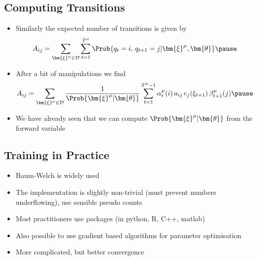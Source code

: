 
\begin{slide}
\section{Computing Transitions}
\begin{PauseHighLight}
  \begin{itemize}
  \item Similarly the expected number of transitions is given by
    \begin{align*}
      A_{ij} = \sum_{\bm{\xi}^\mu\in\mathcal{D}} \sum_{t=1}^{T^\mu}
      \Prob{q_t=i,\, q_{t+1}=j| \bm{\xi}^\mu, \bm{\theta}}\pause
    \end{align*}
  \item After a bit of manipulations we find
    \begin{align*}
      A_{ij} =  \sum_{\bm{\xi}^\mu\in\mathcal{D}} 
      \frac{1}{\Prob{\bm{\xi}^\mu|\bm{\theta}}}\sum_{t=1}^{T^\mu-1}
      \alpha^\mu_t(i)\, a_{ij}\, e_j(\xi_{t+1}) \, \beta^\mu_{t+1}(j)\pause
    \end{align*}
  \item We have already seen that we can compute
    $\Prob{\bm{\xi}^\mu|\bm{\theta}}$ from the forward variable\pause
  \end{itemize}
\end{PauseHighLight}

\end{slide}


\begin{slide}
\section{Training in Practice}

\begin{PauseHighLight}
  \begin{itemize}
  \item Baum-Welch is widely used\pause
  \item The implementation is slightly non-trivial (must prevent numbers
    underflowing), use sensible pseudo counts\pause
  \item Most practitioners use packages (in python, R, C++,
    matlab)\pause
  \item Also possible to use gradient based algorithms for parameter
    optimisation\pause
  \item More complicated, but better convergence\pause
  \end{itemize}
\end{PauseHighLight}

\end{slide}


